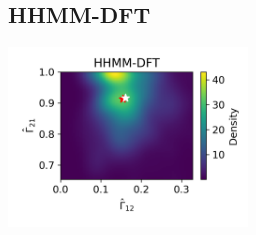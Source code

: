 \documentclass{article}
\begin{document}
        \subsection{HHMM-DFT}
        \begin{center}
        \includegraphics[width=2.5in]{../Plots/hhmm_FV_uncorr_Gamma_density_-1_row_-1.png}
        

\end{center}
\end{document}
